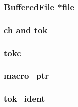 \subsubsection{BufferedFile *file}

\subsubsection{ch and tok}

\subsubsection{tokc}

\subsubsection{macro\_ptr}

\subsubsection{tok\_ident}


